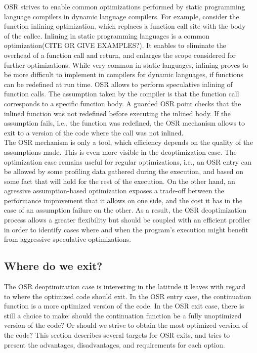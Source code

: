 OSR strives to enable common optimizations performed by static programming language compilers in dynamic language compilers.
For example, consider the function inlining optimization, which replaces a function call site with the body of the callee. 
Inlining in static programming languages is a common optimization(CITE OR GIVE EXAMPLES?).
It enables to eliminate the overhead of a function call and return, and enlarges the scope considered for further optimizations.
While very common in static languages, inlining proves to be more difficult to implement in compilers for dynamic languages, if functions can be redefined at run time.
OSR allows to perform speculative inlining of function calls. 
The assumption taken by the compiler is that the function call corresponds to a specific function body. 
A guarded OSR point checks that the inlined function was not redefined before executing the inlined body.
If the assumption fails, i.e., the function was redefined, the OSR mechanism allows to exit to a version of the code where the call was not inlined.\\

The OSR mechanism is only a tool, which efficiency depends on the quality of the assumptions made.
This is even more visible in the deoptimization case.
The optimization case remains useful for regular optimizations, i.e., an OSR entry can be allowed by some profiling data gathered during the execution, and based on some fact that will hold for the rest of the execution.
On the other hand, an agressive assumption-based optimization exposes a trade-off between the performance improvement that it allows on one side, and the cost it has in the case of an assumption failure on the other.
As a result, the OSR deoptimization process allows a greater flexibility but should be coupled with an efficient profiler in order to identify cases where and when the program's execution might benefit from aggressive speculative optimizations.\\

\subsection{Where do we exit?}
The OSR deoptimization case is interesting in the latitude it leaves with regard to where the optimized code should exit.
In the OSR entry case, the continuation function is a more optimized version of the code.
In the OSR exit case, there is still a choice to make: should the continuation function be a fully unoptimized version of the code? Or should we strive to obtain the most optimized version of the code?
This section describes several targets for OSR exits, and tries to present the advantages, disadvantages, and requirements for each option.\\

